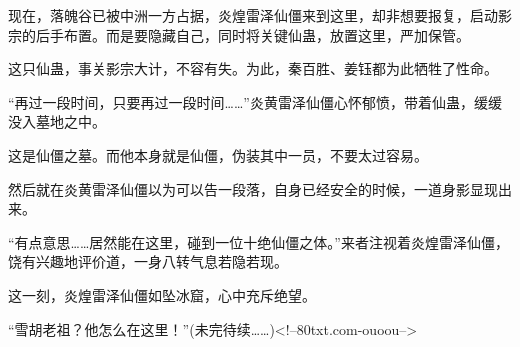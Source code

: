 \begin{this_body}
现在，落魄谷已被中洲一方占据，炎煌雷泽仙僵来到这里，却非想要报复，启动影宗的后手布置。而是要隐藏自己，同时将关键仙蛊，放置这里，严加保管。

这只仙蛊，事关影宗大计，不容有失。为此，秦百胜、姜钰都为此牺牲了性命。

“再过一段时间，只要再过一段时间……”炎黄雷泽仙僵心怀郁愤，带着仙蛊，缓缓没入墓地之中。

这是仙僵之墓。而他本身就是仙僵，伪装其中一员，不要太过容易。

然后就在炎黄雷泽仙僵以为可以告一段落，自身已经安全的时候，一道身影显现出来。

“有点意思……居然能在这里，碰到一位十绝仙僵之体。”来者注视着炎煌雷泽仙僵，饶有兴趣地评价道，一身八转气息若隐若现。

这一刻，炎煌雷泽仙僵如坠冰窟，心中充斥绝望。

“雪胡老祖？他怎么在这里！”(未完待续……)<!--80txt.com-ouoou-->

\end{this_body}

